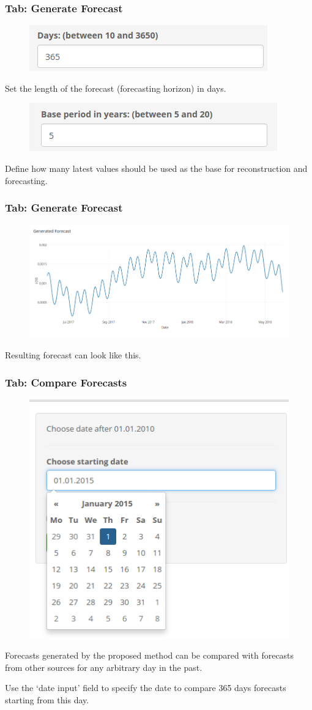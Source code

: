 \documentclass[pdf, unicode, notheorems, xcolor={table}]{beamer}
\begin{document}
\begin{frame}\frametitle{Tab: Generate Forecast}
	\begin{figure}
		\includegraphics[width=0.9 \linewidth]{number_of_days}
	\end{figure}
	Set the length of the forecast (forecasting horizon) in days.
	
	\begin{figure}
		\includegraphics[width=0.9 \linewidth]{base_period}
	\end{figure}
	Define how many latest values should be used as the base for reconstruction and forecasting.
	
\end{frame}

\begin{frame}\frametitle{Tab: Generate Forecast}
	\begin{figure}
		\includegraphics[width=0.8 \linewidth]{generate_result}
	\end{figure}
	Resulting forecast can look like this.
\end{frame}

\begin{frame}\frametitle{Tab: Compare Forecasts}
	\begin{figure}
		\includegraphics[width=0.4 \linewidth]{compare_date}
	\end{figure}
	Forecasts generated by the proposed method can be compared with forecasts from other sources for any arbitrary day in the past.
	
	Use the `date input' field to specify the date to compare 365 days forecasts starting from this day.
\end{frame}
\end{document}
